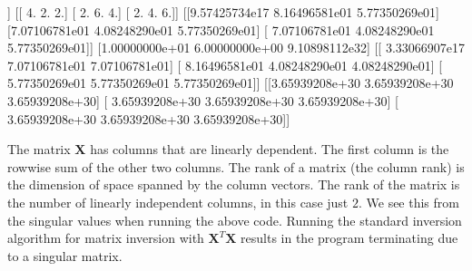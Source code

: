 \documentclass[letterpaper,10pt,english]{sphinxmanual}
\begin{document}
\begin{sphinxVerbatim}[commandchars=\\\{\}]
  \PYG{p}{[} \PYG{p}{[}  \PYG{p}{]} \PYG{p}{[}  \PYG{p}{]} \PYG{p}{[}  \PYG{p}{]} \PYG{p}{[}  \PYG{p}{]} \PYG{p}{]}
    
  
\end{sphinxVerbatim}

\begin{sphinxVerbatim}[commandchars=\\\{\}]
[[ 1. \PYGZhy{}1.  2.]
 [ 1.  0.  1.]
 [ 1.  2. \PYGZhy{}1.]
 [ 1.  1.  0.]]
[[ 4.  2.  2.]
 [ 2.  6. \PYGZhy{}4.]
 [ 2. \PYGZhy{}4.  6.]]
[[\PYGZhy{}9.57425734e\PYGZhy{}17  8.16496581e\PYGZhy{}01 \PYGZhy{}5.77350269e\PYGZhy{}01]
 [\PYGZhy{}7.07106781e\PYGZhy{}01  4.08248290e\PYGZhy{}01  5.77350269e\PYGZhy{}01]
 [ 7.07106781e\PYGZhy{}01  4.08248290e\PYGZhy{}01  5.77350269e\PYGZhy{}01]]
[1.00000000e+01 6.00000000e+00 9.10898112e\PYGZhy{}32]
[[ 3.33066907e\PYGZhy{}17 \PYGZhy{}7.07106781e\PYGZhy{}01  7.07106781e\PYGZhy{}01]
 [ 8.16496581e\PYGZhy{}01  4.08248290e\PYGZhy{}01  4.08248290e\PYGZhy{}01]
 [ 5.77350269e\PYGZhy{}01 \PYGZhy{}5.77350269e\PYGZhy{}01 \PYGZhy{}5.77350269e\PYGZhy{}01]]
[[\PYGZhy{}3.65939208e+30  3.65939208e+30  3.65939208e+30]
 [ 3.65939208e+30 \PYGZhy{}3.65939208e+30 \PYGZhy{}3.65939208e+30]
 [ 3.65939208e+30 \PYGZhy{}3.65939208e+30 \PYGZhy{}3.65939208e+30]]
\end{sphinxVerbatim}

The matrix \(\boldsymbol{X}\) has columns that are linearly dependent. The first
column is the row\sphinxhyphen{}wise sum of the other two columns. The rank of a
matrix (the column rank) is the dimension of space spanned by the
column vectors. The rank of the matrix is the number of linearly
independent columns, in this case just \(2\). We see this from the
singular values when running the above code. Running the standard
inversion algorithm for matrix inversion with \(\boldsymbol{X}^T\boldsymbol{X}\) results
in the program terminating due to a singular matrix.
\end{document}
